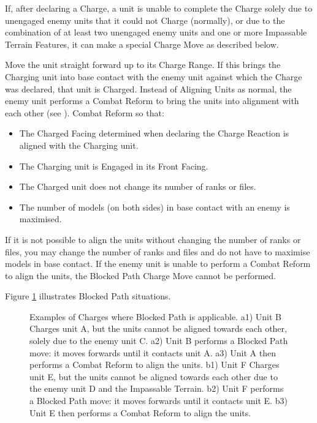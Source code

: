 If, after declaring a Charge, a unit is unable to complete the Charge solely due to unengaged enemy units that it could not Charge (normally), or due to the combination of at least two unengaged enemy units and one or more Impassable Terrain Features, it can make a special Charge Move as described below.

Move the unit straight forward up to its Charge Range. If this brings the Charging unit into base contact with the enemy unit against which the Charge was declared, that unit is Charged. Instead of Aligning Units as normal, the enemy unit performs a Combat Reform to bring the units into alignment with each other (see ). Combat Reform so that:

\begin{itemize}
\item The Charged Facing determined when declaring the Charge Reaction is aligned with the Charging unit.
\item The Charging unit is Engaged in its Front Facing.
\item The Charged unit does not change its number of ranks or files.
\item The number of models (on both sides) in base contact with an enemy is maximised.
\end{itemize}

If it is not possible to align the units without changing the number of ranks or files, you may change the number of ranks and files and do not have to maximise models in base contact. If the enemy unit is unable to perform a Combat Reform to align the units, the Blocked Path Charge Move cannot be performed.

Figure \ref{figure/blocked_path} illustrates Blocked Path situations.

\newcommand{\figBPAOne}{a1)}
\newcommand{\figBPATwo}{a2)}
\newcommand{\figBPAThree}{a3)}
\newcommand{\figBPBOne}{b1)}
\newcommand{\figBPBTwo}{b2)}
\newcommand{\figBPBThree}{b3)}
\newcommand{\figBPCharge}{\fontsize{4}{5}\selectfont{\flufffont{Charge!}}}

\begin{figure}[!htbp]
\renewcommand{\figbiglettersize}{13}
	\centering
	\def\svgwidth{\textwidth}
	
	\caption{Examples of Charges where Blocked Path is applicable.\captionpar
	a1) Unit B Charges unit A, but the units cannot be aligned towards each other, solely due to the enemy unit C.\newline
	a2) Unit B performs a Blocked Path move: it moves forwards until it contacts unit A.\newline
	a3) Unit A then performs a Combat Reform to align the units.\newline
	b1) Unit F Charges unit E, but the units cannot be aligned towards each other due to the enemy unit D and the Impassable Terrain.\newline
	b2) Unit F performs a Blocked Path move: it moves forwards until it contacts unit E.\newline
	b3) Unit E then performs a Combat Reform to align the units.%
	}
	\label{figure/blocked_path}
\end{figure}

